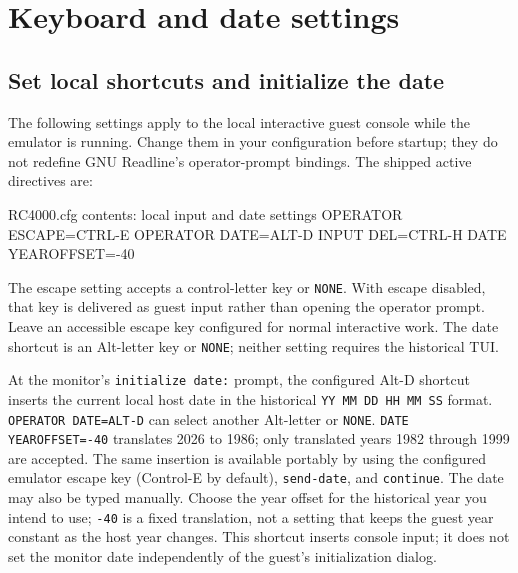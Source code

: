 \chapter{Keyboard and date settings}\label{keyboard-and-date-settings}

\section{Set local shortcuts and initialize the date}\label{set-local-shortcuts-and-initialize-the-date}

The following settings apply to the local interactive guest console while the emulator is running. Change them in your configuration before startup; they do not redefine GNU Readline's operator-prompt bindings. The shipped active directives are:

\begin{commandexample}{RC4000.cfg contents: local input and date settings}
OPERATOR ESCAPE=CTRL-E
OPERATOR DATE=ALT-D
INPUT DEL=CTRL-H
DATE YEAROFFSET=-40
\end{commandexample}

The escape setting accepts a control-letter key or \passthrough{\lstinline!NONE!}. With escape disabled, that key is delivered as guest input rather than opening the operator prompt. Leave an accessible escape key configured for normal interactive work. The date shortcut is an Alt-letter key or \passthrough{\lstinline!NONE!}; neither setting requires the historical TUI.

At the monitor's \passthrough{\lstinline!initialize date:!} prompt, the configured Alt-D shortcut inserts the current local host date in the historical \passthrough{\lstinline!YY MM DD HH MM SS!} format. \passthrough{\lstinline!OPERATOR DATE=ALT-D!} can select another Alt-letter or \passthrough{\lstinline!NONE!}. \passthrough{\lstinline!DATE YEAROFFSET=-40!} translates 2026 to 1986; only translated years 1982 through 1999 are accepted. The same insertion is available portably by using the configured emulator escape key (Control-E by default), \passthrough{\lstinline!send-date!}, and \passthrough{\lstinline!continue!}. The date may also be typed manually. Choose the year offset for the historical year you intend to use; \passthrough{\lstinline!-40!} is a fixed translation, not a setting that keeps the guest year constant as the host year changes. This shortcut inserts console input; it does not set the monitor date independently of the guest's initialization dialog.

